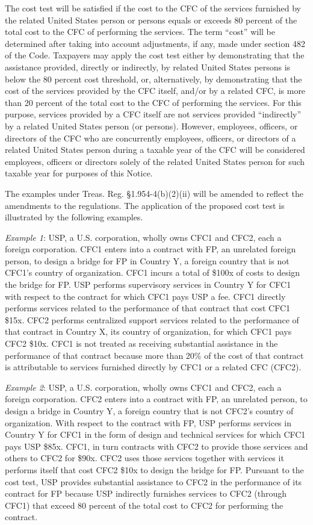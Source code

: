 \begin{select}
The cost test will be satisfied if the cost to the CFC of the services furnished by the related United States person or persons equals or exceeds 80 percent of the total cost to the CFC of performing the services. The term ``cost'' will be determined after taking into account adjustments, if any, made under section 482 of the Code. Taxpayers may apply the cost test either by demonstrating that the assistance provided, directly or indirectly, by related United States persons is below the 80 percent cost threshold, or, alternatively, by demonstrating that the cost of the services provided by the CFC itself, and/or by a related CFC, is more than 20 percent of the total cost to the CFC of performing the services. For this purpose, services provided by a CFC itself are not services provided ``indirectly'' by a related United States person (or persons). However, employees, officers, or directors of the CFC who are concurrently employees, officers, or directors of a related United States person during a taxable year of the CFC will be considered employees, officers or directors solely of the related United States person for such taxable year for purposes of this Notice.

The examples under Treas. Reg. \S 1.954-4(b)(2)(ii) will be amended to reflect the amendments to the regulations. The application of the proposed cost test is illustrated by the following examples.

\emph{Example 1}: USP, a U.S. corporation, wholly owns CFC1 and CFC2, each a foreign corporation. CFC1 enters into a contract with FP, an unrelated foreign person, to design a bridge for FP in Country Y, a foreign country that is not CFC1's country of organization. CFC1 incurs a total of \$100x of costs to design the bridge for FP. USP performs supervisory services in Country Y for CFC1 with respect to the contract for which CFC1 pays USP a fee. CFC1 directly performs services related to the performance of that contract that cost CFC1 \$15x. CFC2 performs centralized support services related to the performance of that contract in Country X, its country of organization, for which CFC1 pays CFC2 \$10x. CFC1 is not treated as receiving substantial assistance in the performance of that contract because more than 20\% of the cost of that contract is attributable to services furnished directly by CFC1 or a related CFC (CFC2).

\emph{Example 2}: USP, a U.S. corporation, wholly owns CFC1 and CFC2, each a foreign corporation. CFC2 enters into a contract with FP, an unrelated person, to design a bridge in Country Y, a foreign country that is not CFC2's country of organization. With respect to the contract with FP, USP performs services in Country Y for CFC1 in the form of design and technical services for which CFC1 pays USP \$85x. CFC1, in turn contracts with CFC2 to provide those services and others to CFC2 for \$90x. CFC2 uses those services together with services it performs itself that cost CFC2 \$10x to design the bridge for FP. Pursuant to the cost test, USP provides substantial assistance to CFC2 in the performance of its contract for FP because USP indirectly furnishes services to CFC2 (through CFC1) that exceed 80 percent of the total cost to CFC2 for performing the contract.


\end{select}
